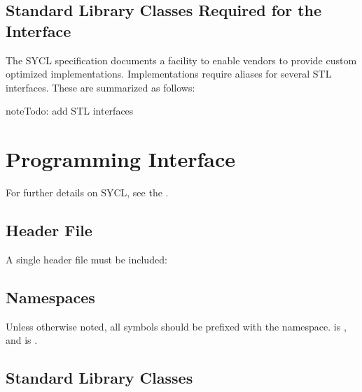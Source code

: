 \documentclass[letterpaper,10pt,english]{sphinxmanual}
\begin{document}
\section{Standard Library Classes Required for the Interface}
\label{\detokenize{language/index:standard-library-classes-required-for-the-interface}}
The SYCL specification documents a facility to enable vendors to provide
custom optimized implementations. Implementations require aliases for
several STL interfaces. These are summarized as follows:

\begin{sphinxadmonition}{note}{\label{\detokenize{language/index:id2}}Todo:}
add STL interfaces
\end{sphinxadmonition}


\chapter{Programming Interface}
\label{\detokenize{programming-interface/index:programming-interface}}\label{\detokenize{programming-interface/index::doc}}
For further details on SYCL, see the .


\section{Header File}
\label{\detokenize{programming-interface/index:header-file}}
A single header file must be included:

\begin{sphinxVerbatim}[commandchars=\\\{\}]
\end{sphinxVerbatim}


\section{Namespaces}
\label{\detokenize{programming-interface/index:namespaces}}
Unless otherwise noted, all symbols should be prefixed with the
 namespace.  is , and
 is .


\section{Standard Library Classes}
\label{\detokenize{programming-interface/index:standard-library-classes}}
\end{document}
